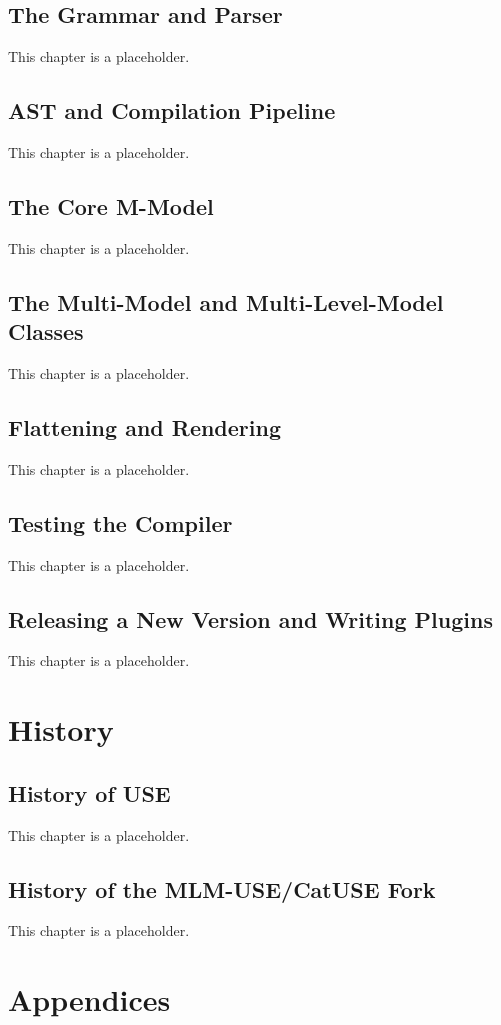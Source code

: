 \documentclass[11pt,twoside,a4paper]{book}
\begin{document}
\chapter{The Grammar and Parser}
\label{sec:org2428bfd}
This chapter is a placeholder.
\chapter{AST and Compilation Pipeline}
\label{sec:org2f8cca8}
This chapter is a placeholder.
\chapter{The Core M-Model}
\label{sec:org2126ce5}
This chapter is a placeholder.
\chapter{The Multi-Model and Multi-Level-Model Classes}
\label{sec:orgf2fe246}
This chapter is a placeholder.
\chapter{Flattening and Rendering}
\label{sec:orga6105c5}
This chapter is a placeholder.
\chapter{Testing the Compiler}
\label{sec:org81ba744}
This chapter is a placeholder.
\chapter{Releasing a New Version and Writing Plugins}
\label{sec:orgd70fe7b}
This chapter is a placeholder.
\part{History}
\label{sec:orgec8e296}
\chapter{History of USE}
\label{sec:org0e3142d}
This chapter is a placeholder.
\chapter{History of the MLM-USE/CatUSE Fork}
\label{sec:org12fe097}
This chapter is a placeholder.

\appendix

\part{Appendices}
\label{sec:org781bb22}
\end{document}
